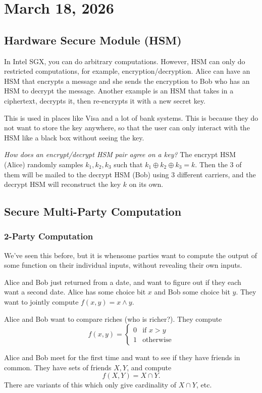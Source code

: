 \section{March 18, 2026}
\label{20260318}

\subsection{Hardware Secure Module (HSM)}

In Intel SGX, you can do arbitrary computations. However, HSM can only do restricted computations, for example, encryption/decryption. Alice can have an HSM that encrypts a message and she sends the encryption to Bob who has an HSM to decrypt the message. Another example is an HSM that takes in a ciphertext, decrypts it, then re-encrypts it with a new secret key.

This is used in places like Visa and a lot of bank systems. This is because they do not want to store the key anywhere, so that the user can only interact with the HSM like a black box without seeing the key.

\textit{How does an encrypt/decrypt HSM pair agree on a key?} The encrypt HSM (Alice) randomly samples $k_1, k_2, k_3$ such that $k_1 \oplus k_2 \oplus k_3 = k$. Then the 3 of them will be mailed to the decrypt HSM (Bob) using 3 different carriers, and the decrypt HSM will reconstruct the key $k$ on its own.

\subsection{Secure Multi-Party Computation}

\subsubsection{2-Party Computation}

We've seen this before, but it is whensome parties want to compute the output of some function on their individual inputs, without revealing their own inputs.

\begin{example}
    Alice and Bob just returned from a date, and want to figure out if they each want a second date. Alice has some choice bit $x$ and Bob some choice bit $y$. They want to jointly compute $f(x, y) = x\land y$.
\end{example}
\begin{example}
    Alice and Bob want to compare riches (who is richer?). They compute
    \[f(x, y) = \begin{cases}
            0 & \text{if }x>y    \\
            1 & \text{otherwise}
        \end{cases}\]
\end{example}
\begin{example}
    Alice and Bob meet for the first time and want to see if they have friends in common. They have sets of friends $X,Y$, and compute
    \[f(X, Y) = X\cap Y.\]
    There are variants of this which only give cardinality of $X\cap Y$, etc.
\end{example}

